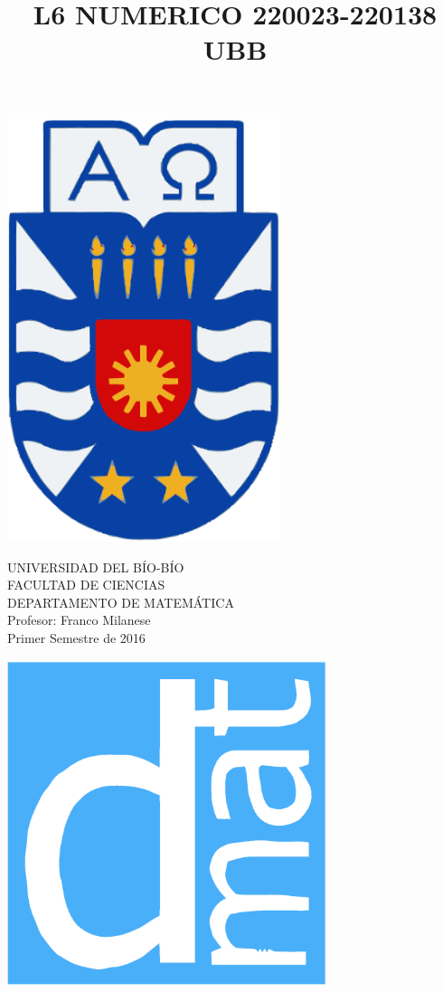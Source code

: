\documentclass[11pt]{article}
\begin{document}
\title{L6 NUMERICO 220023-220138 UBB}

{\begin{minipage}{2cm}
\hspace*{1cm}\includegraphics[width=0.6\textwidth]{escubo-ubb.eps}
\end{minipage}
\begin{minipage}{12cm}
\small
{\bf \rm 
{
\begin{center}
{\footnotesize UNIVERSIDAD DEL B\'IO-B\'IO} \\
{\scriptsize FACULTAD DE CIENCIAS}  \\
{\scriptsize DEPARTAMENTO DE MATEM\'ATICA}  \\
{\scriptsize Profesor:  Franco Milanese}\\
{\scriptsize Primer Semestre de 2016}
\end{center}
}}
\end{minipage}}
{\begin{minipage}{2cm}
\hspace*{-0.5cm}\vspace*{-0.05cm}\includegraphics[width=0.7\textwidth]{escudo-dmat.eps}
\end{minipage}}
\end{document}

